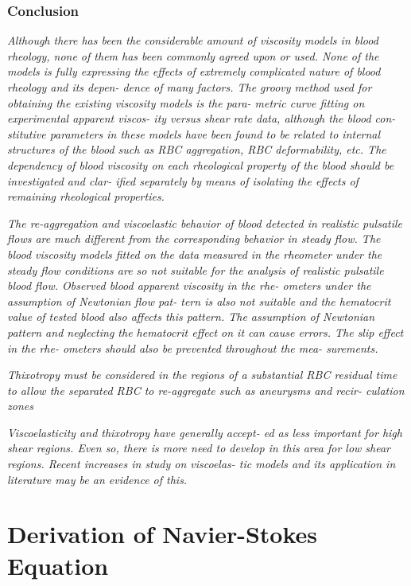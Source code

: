 \documentclass[11pt,letterpaper]{article}
\begin{document}
 \subsubsection*{Conclusion}
\textit{Although there has been  the considerable amount of viscosity models in blood  rheology, none of them  has been commonly agreed upon or used. None of the models is fully expressing the effects of extremely complicated nature of blood  rheology and  its  depen- dence of many factors. The groovy method used for obtaining the existing viscosity models is  the para- metric curve fitting on experimental apparent  viscos- ity versus shear rate  data,  although the  blood con- stitutive parameters in these models have been found to be  related to internal  structures of the blood such  as RBC aggregation, RBC deformability,  etc. The dependency of blood  viscosity on each rheological property of the  blood should  be investigated and  clar- ified separately  by  means of  isolating the effects of remaining rheological properties.}


\textit{The  re-aggregation and  viscoelastic behavior of  blood detected in  realistic pulsatile flows are  much  different from  the corresponding behavior  in steady  flow. The blood viscosity models fitted on the  data measured in the rheometer under the steady flow conditions are so not suitable for the  analysis of  realistic  pulsatile blood flow. Observed blood apparent  viscosity in  the rhe- ometers under the assumption of Newtonian flow pat- tern is also not suitable and the hematocrit value of tested blood also affects this pattern. The assumption of Newtonian pattern and  neglecting the  hematocrit effect on  it can cause  errors. The  slip effect  in  the rhe- ometers  should also be  prevented throughout  the mea- surements.}

\textit{Thixotropy must be  considered  in the regions  of  a substantial RBC residual  time  to allow the  separated RBC to  re-aggregate  such as aneurysms and  recir- culation zones}

\textit{Viscoelasticity  and thixotropy  have generally accept- ed  as  less important for high shear  regions. Even  so, there is more need  to develop in this area  for  low shear  regions. Recent  increases in  study on viscoelas- tic models  and its application in literature may be an evidence of this.}

\newpage
\section{Derivation of Navier-Stokes Equation}
\end{document}
